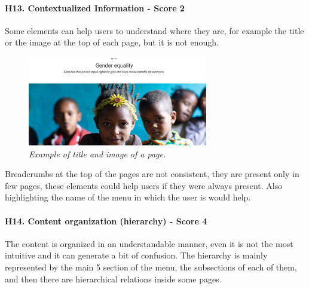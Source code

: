 \newline
\newline \paragraph{H13. Contextualized Information - Score 2}  \label{subsec:H13}	Some elements can help users to understand where they are, for example the title or the image at the top of each page, but it is not enough.
\begin{figure}[!h]
	\begin{center}
		\includegraphics[width=0.7\textwidth]{FinalScores17.jpg}
		\captionsetup{font=small}
		\caption{\textit{Example of title and image of a page.}}
	\end{center}
\end{figure}
\newline Breadcrumbs at the top of the pages are not consistent, they are present only in few pages, these elements could help users if they were always present.
\newline Also highlighting the name of the menu in which the user is would help.
\newline
\newline \paragraph{H14. Content organization (hierarchy) - Score 4}  \label{subsec:H14}	The content is organized in an understandable manner, even it is not the most intuitive and it can generate a bit of confusion.
\newline The hierarchy is mainly represented by the main 5 section of the menu, the subsections of each of them, and then there are hierarchical relations inside some pages.   
